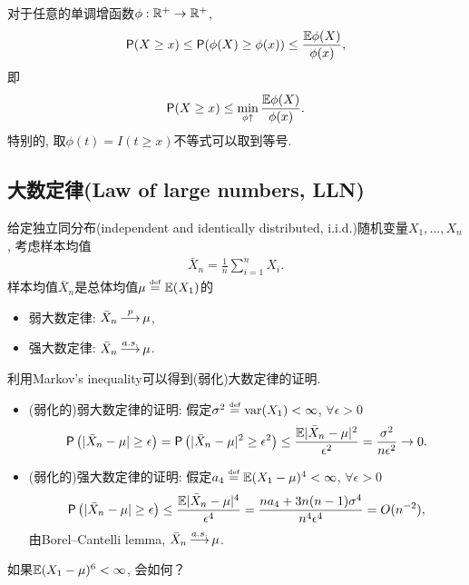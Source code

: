 \begin{remark}
对于任意的单调增函数$\phi: \mathbb{R}^{+} \to \mathbb{R}^{+}$, 
\begin{align*}
	\textsf{P}(X \geq x) \leq \textsf{P}(\phi(X) \geq \phi(x)) \leq \frac{\mathbb{E} \phi(X)}{\phi(x)},
\end{align*}
即
\begin{align*}
	\textsf{P}(X \geq x) \leq \min_{\phi \uparrow} 	\frac{\mathbb{E} \phi(X)}{\phi(x)}.
\end{align*}	
特别的, 取$\phi(t)=I(t \geq x)$不等式可以取到等号.
\end{remark}




\subsection{大数定律(Law of large numbers, LLN)}
	给定独立同分布(independent and identically distributed, i.i.d.)随机变量$X_1,\ldots,X_n$, 考虑样本均值
\begin{align*}
	\bar{X}_n=\frac{1}{n} \sum_{i=1}^n X_i.
\end{align*}
样本均值$\bar{X}_n$是总体均值$\mu \stackrel{\mbox{\textrm{\tiny def}}}{=} \mathbb{E} (X_1)$的
\begin{itemize}
	\item 弱大数定律: $\bar{X}_n \topr \mu$,
	\item 强大数定律: $\bar{X}_n \toas \mu$.
\end{itemize}
利用Markov's inequality可以得到(弱化)大数定律的证明.
\begin{itemize}
	\item (弱化的)弱大数定律的证明: 假定$\sigma^2  \stackrel{\mbox{\textrm{\tiny def}}}{=} \mbox{var}(X_1)<\infty$, $\forall \epsilon>0$
	\begin{align*}
		\textsf{P}\left(|\bar{X}_n-\mu| \geq \epsilon \right)=\textsf{P}\left(|\bar{X}_n-\mu|^2 \geq \epsilon^2 \right)\leq \frac{\mathbb{E} |\bar{X}_n-\mu|^2}{\epsilon^2}=\frac{\sigma^2}{n \epsilon^2} \to 0.
	\end{align*}
	\item (弱化的)强大数定律的证明: 假定$a_4\stackrel{\mbox{\textrm{\tiny def}}}{=} \mathbb{E}(X_1-\mu)^4<\infty$, $\forall \epsilon>0$
	\begin{align*}
		\textsf{P}\left(|\bar{X}_n-\mu| \geq \epsilon \right) \leq \frac{\mathbb{E} |\bar{X}_n-\mu|^4}{\epsilon^4}=\frac{n a_4+3n(n-1)\sigma^4}{n^4 \epsilon^4}=O(n^{-2}),
	\end{align*}
	由Borel–Cantelli lemma, $\bar{X}_n \toas \mu$. 
\end{itemize}	
\begin{ques}
	如果$\mathbb{E}(X_1-\mu)^6<\infty$, 会如何？
\end{ques}


